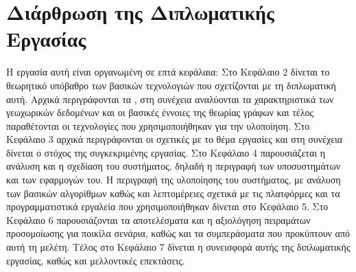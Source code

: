 \section{Διάρθρωση της Διπλωματικής Εργασίας}

Η εργασία αυτή είναι οργανωμένη σε επτά κεφάλαια: Στο Κεφάλαιο 2
δίνεται το θεωρητικό υπόβαθρο των βασικών τεχνολογιών που
σχετίζονται με τη διπλωματική αυτή. Αρχικά περιγράφονται τα
, στη συνέχεια αναλύονται τα
χαρακτηριστικά των γεωχωρικών δεδομένων και οι βασικές έννοιες
της θεωρίας γράφων και τέλος παραθέτονται οι τεχνολογίες που
χρησιμοποιήθηκαν για την υλοποίηση. Στο
Κεφάλαιο 3 αρχικά περιγράφονται οι σχετικές με το θέμα εργασίες
και στη συνέχεια δίνεται ο στόχος της συγκεκριμένης εργασίας. Στο
Κεφάλαιο 4 παρουσιάζεται η ανάλυση και η σχεδίαση του συστήματος,
δηλαδή η περιγραφή των υποσυστημάτων και των εφαρμογών του. Η
περιγραφή της υλοποίησης του συστήματος, με ανάλυση των βασικών
αλγορίθμων καθώς και λεπτομέρειες σχετικά με τις πλατφόρμες και τα
προγραμματιστικά εργαλεία που χρησιμοποιήθηκαν δίνεται στο
Κεφάλαιο 5. Στο Κεφάλαιο 6 παρουσιάζονται τα αποτελέσματα και
η αξιολόγηση πειραμάτων προσομοίωσης για ποικίλα σενάρια, καθώς
και τα συμπεράσματα που προκύπτουν από αυτή τη μελέτη.
Τέλος στο Κεφάλαιο 7 δίνεται η συνεισφορά αυτής της
διπλωματικής εργασίας, καθώς και μελλοντικές επεκτάσεις.